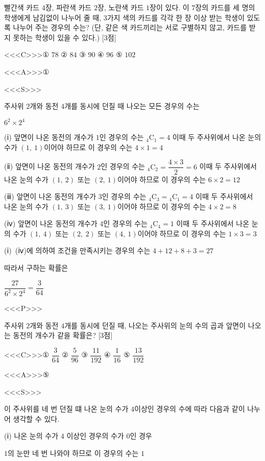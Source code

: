 \documentclass{oblivoir}
\begin{document}
빨간색 카드 $4$장, 파란색 카드 $2$장, 노란색 카드 $1$장이 있다. 이 $7$장의 카드를 세 명의 학생에게 남김없이 나누어 줄 때, $3$가지 색의 카드를 각각 한 장 이상 받는 학생이 있도록 나누어 주는 경우의 수는? (단, 같은 색 카드끼리는 서로 구별하지 않고, 카드를 받지 못하는 학생이 있을 수 있다.) [3점]

<<<C>>>① $78$ ② $84$ ③ $90$ ④ $96$ ⑤ $102$

<<<A>>>①

<<<S>>>

주사위 $2$개와 동전 $4$개를 동시에 던질 때 나오는 모든 경우의 수는

$6^{2}\times 2^{4}$

(ⅰ) 앞면이 나온 동전의 개수가 $1$인 경우의 수는
${}_{4}\mathrm{C}_{1}=4$
이때 두 주사위에서 나온 눈의 수가 $(1,\:1)$이어야 하므로 이 경우의 수는 $4\times 1=4$

(ⅱ) 앞면이 나온 동전의 개수가 $2$인 경우의 수는
${}_{4}\mathrm{C}_{2}=\dfrac{4\times 3}{2}=6$
이때 두 주사위에서 나온 눈의 수가 $(1,\:2)$ 또는 $(2,\:1)$이어야 하므로 이 경우의 수는 $6\times 2=12$

(ⅲ) 앞면이 나온 동전의 개수가 $3$인 경우의 수는
${}_{4}\mathrm{C}_{3}={}_{4}\mathrm{C}_{1}=4$
이때 두 주사위에서 나온 눈의 수가 $(1,\:3)$ 또는 $(3,\:1)$이어야 하므로 이 경우의 수는 $4\times 2=8$

(ⅳ) 앞면이 나온 동전의 개수가 $4$인 경우의 수는
${}_{4}\mathrm{C}_{4}=1$
이때 두 주사위에서 나온 눈의 수가 $(1,\:4)$ 또는 $(2,\:2)$ 또는 $(4,\:1)$이어야 하므로 이 경우의 수는 $1\times 3=3$

(ⅰ)~(ⅳ)에 의하여 조건을 만족시키는 경우의 수는 $4+12+8+3=27$

따라서 구하는 확률은

$\dfrac{27}{6^{2}\times 2^{4}}=\dfrac{3}{64}$

<<<P>>>

주사위 $2$개와 동전 $4$개를 동시에 던질 때, 나오는 주사위의 눈의 수의 곱과 앞면이 나오는 동전의 개수가 같을 확률은? [3점]

<<<C>>>① $\dfrac{3}{64}$ ② $\dfrac{5}{96}$ ③ $\dfrac{11}{192}$ ④ $\dfrac{1}{16}$ ⑤ $\dfrac{13}{192}$

<<<A>>>⑤

<<<S>>>

이 주사위를 네 번 던질 떄 나온 눈의 수가 $4$이상인 경우의 수에 따라 다음과 같이 나누어 생각할 수 있다.

(ⅰ) 나온 눈의 수가 $4$ 이상인 경우의 수가 $0$인 경우

$1$의 눈만 네 번 나와야 하므로 이 경우의 수는 $1$
\end{document}
